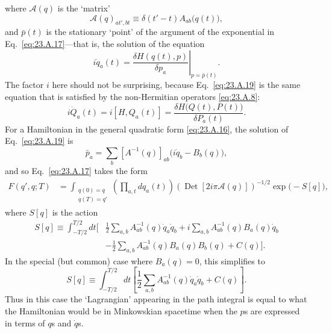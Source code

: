 where $\mathcal A(q)$ is the `matrix'
\begin{equation}
 \mathcal A(q)_{at',bt}\equiv\delta(t'-t)A_{ab}\bigl(q(t)\bigr),
 \tag{23.A.18}\label{eq:23.A.18}
\end{equation}
and $\bar p(t)$ is the stationary `point' of the argument of the exponential in Eq.~\eqref{eq:23.A.17}---that is, the solution of the equation
\begin{equation}
 i\dot q_a(t)
 =\left.
 \frac{\delta H(q(t),p)}{\delta p_a}
 \right|_{p=\bar p(t)}.
 \tag{23.A.19}\label{eq:23.A.19}
\end{equation}
The factor $i$ here should not be surprising, because Eq.~\eqref{eq:23.A.19} is the same equation that is satisfied by the non-Hermitian operators \eqref{eq:23.A.8}:
\[
 i\dot Q_a(t)=i[H,Q_a(t)]
 =\frac{\delta H\bigl(Q(t),P(t)\bigr)}{\delta P_a(t)}.
\]
For a Hamiltonian in the general quadratic form \eqref{eq:23.A.16}, the solution of Eq.~\eqref{eq:23.A.19} is
\begin{equation}
 \bar p_a=\sum_b\left[A^{-1}(q)\right]_{ab}
 \bigl(i\dot q_b-B_b(q)\bigr),
 \tag{23.A.20}\label{eq:23.A.20}
\end{equation}
and so Eq.~\eqref{eq:23.A.17} takes the form
\begin{equation}
\begin{aligned}
 F(q',q;T)
 &=
 \int_{\substack{q(0)=q\\q(T)=q'}}
 \left(\prod_{a,t}dq_a(t)\right)
 \left(\operatorname{Det}\left[2i\pi\mathcal A(q)\right]\right)^{-1/2}
 \exp\bigl(-S[q]\bigr),
\end{aligned}
 \tag{23.A.21}\label{eq:23.A.21}
\end{equation}
where $S[q]$ is the action
\begin{equation}
\begin{aligned}
 S[q]\equiv\int_{-T/2}^{T/2}dt\biggl[
 &\frac{1}{2}\sum_{a,b}A^{-1}_{ab}(q)\dot q_a\dot q_b
 +i\sum_{a,b}A^{-1}_{ab}(q)B_a(q)\dot q_b\\
 &-\frac{1}{2}\sum_{a,b}A^{-1}_{ab}(q)B_a(q)B_b(q)+C(q)
 \biggr].
\end{aligned}
 \tag{23.A.22}\label{eq:23.A.22}
\end{equation}
In the special (but common) case where $B_a(q)=0$, this simplifies to
\begin{equation}
 S[q]\equiv\int_{-T/2}^{T/2}dt
 \left[
 \frac{1}{2}\sum_{a,b}A^{-1}_{ab}(q)\dot q_a\dot q_b+C(q)
 \right].
 \tag{23.A.23}\label{eq:23.A.23}
\end{equation}
Thus in this case the `Lagrangian' appearing in the path integral is equal to what the Hamiltonian would be in Minkowskian spacetime when the $p$s are expressed in terms of $q$s and $\dot q$s.
